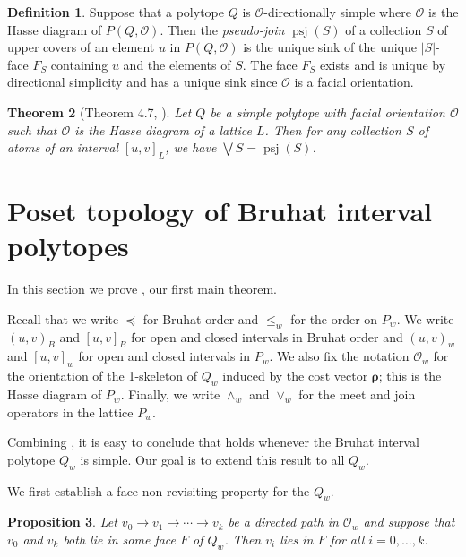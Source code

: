 \documentclass[12pt]{amsart}
\theoremstyle{plain}
\newtheorem{thm}{Theorem}[section]
\newtheorem{prop}[thm]{Proposition}
\theoremstyle{definition}
\newtheorem{defn}[thm]{Definition}
\theoremstyle{remark}
\DeclareMathOperator{\psj}{psj}
\begin{document}
\begin{defn}
Suppose that a polytope $Q$ is $\mathcal{O}$-directionally simple where $\mathcal{O}$ is the Hasse diagram of $P(Q,\mathcal{O})$. Then the {\it pseudo-join} $\psj(S)$ of a collection $S$ of upper covers of an element $u$ in $P(Q,\mathcal{O})$ is the unique sink of the unique $|S|$-face $F_S$ containing $u$ and the elements of $S$. The face $F_S$ exists and is unique by directional simplicity and has a unique sink since $\mathcal{O}$ is a facial orientation.
\end{defn}


\begin{thm}[Theorem 4.7, \cite{He}]
Let $Q$ be a simple polytope with facial orientation $\mathcal{O}$ such that $\mathcal{O}$ is the Hasse diagram of a lattice $L$.  Then for any collection $S$ of atoms of an interval $[u,v]_L$, we have $\bigvee S = \psj(S)$.  
\end{thm}


\section{Poset topology of Bruhat interval polytopes}

In this section we prove , our first main theorem.

Recall that we write $\preceq$ for Bruhat order and $\leq_w$ for the order on $P_w$. We write $(u,v)_B$ and $[u,v]_B$ for open and closed intervals in Bruhat order and $(u,v)_w$ and $[u,v]_w$ for open and closed intervals in $P_w$. We also fix the notation $\mathcal{O}_w$ for the orientation of the 1-skeleton of $Q_w$ induced by the cost vector $\boldsymbol{\rho}$; this is the Hasse diagram of $P_w$. Finally, we write $\wedge_w$ and $\vee_w$ for the meet and join operators in the lattice $P_w$.

Combining , it is easy to conclude that  holds whenever the Bruhat interval polytope $Q_w$ is simple. Our goal is to extend this result to all $Q_w$. 

We first establish a face non-revisiting property for the $Q_w$.

\begin{prop}\label{prop:nonrevisit-property}
Let $v_0 \to v_1 \to \cdots \to v_k$ be a directed path in $\mathcal{O}_w$ and suppose that $v_0$ and $v_k$ both lie in some face $F$ of $Q_w$. Then $v_i$ lies in $F$ for all $i=0,\ldots,k$.
\end{prop}
\end{document}
